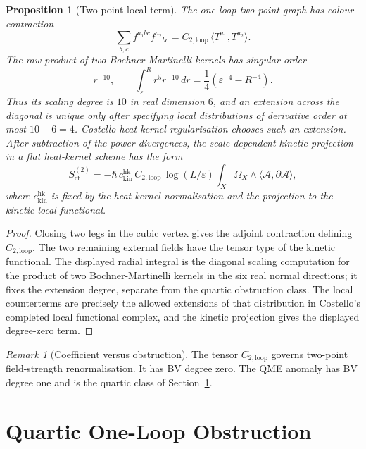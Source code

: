 \documentclass[11pt]{article}
\newtheorem{proposition}[theorem]{Proposition}
\theoremstyle{definition}
\theoremstyle{remark}
\newtheorem{remark}[theorem]{Remark}
\providecommand{\dbar}{\bar{\partial}}
\providecommand{\cA}{\mathcal{A}}
\providecommand{\Ctwo}{C_{2,\mathrm{loop}}}
\begin{document}
\begin{proposition}[Two-point local term]
\label{prop:two-point-local-term}
The one-loop two-point graph has colour contraction
\[
  \sum_{b,c}f^{a_1bc}f^{a_2}{}_{bc}
  =
  \Ctwo\,\langle T^{a_1},T^{a_2}\rangle .
\]
The raw product of two Bochner-Martinelli kernels has singular order
\[
  r^{-10},
  \qquad
  \int_\varepsilon^R r^5r^{-10}\,dr
  =
  \frac14(\varepsilon^{-4}-R^{-4}).
\]
Thus its scaling degree is $10$ in real dimension $6$, and an extension
across the diagonal is unique only after specifying local distributions
of derivative order at most $10-6=4$.  Costello heat-kernel
regularisation chooses such an extension.  After subtraction of the
power divergences, the scale-dependent kinetic projection in a flat
heat-kernel scheme has the form
\[
  S_{\mathrm{ct}}^{(2)}
  =
  -\hbar\,c_{\mathrm{kin}}^{\mathrm{hk}}\,
  \Ctwo\,
  \log(L/\varepsilon)
  \int_X\Omega_X\wedge\langle\cA,\dbar\cA\rangle ,
\]
where $c_{\mathrm{kin}}^{\mathrm{hk}}$ is fixed by the heat-kernel
normalisation and the projection to the kinetic local functional.
\end{proposition}

\begin{proof}
Closing two legs in the cubic vertex gives the adjoint contraction
defining $\Ctwo$.  The two remaining external fields have the tensor
type of the kinetic functional.  The displayed radial integral is the
diagonal scaling computation for the product of two
Bochner-Martinelli kernels in the six real normal directions; it fixes
the extension degree, separate from the quartic obstruction class.  The local
counterterms are precisely the allowed extensions of that distribution
in Costello's completed local functional complex, and the kinetic
projection gives the displayed degree-zero term.
\end{proof}

\begin{remark}[Coefficient versus obstruction]
\label{rem:c2-versus-i4}
The tensor $\Ctwo$ governs two-point field-strength renormalisation.
It has BV degree zero.  The QME anomaly has BV degree one and is the
quartic class of Section~\ref{sec:quartic-obstruction}.
\end{remark}

\section{Quartic One-Loop Obstruction}
\label{sec:quartic-obstruction}
\end{document}
